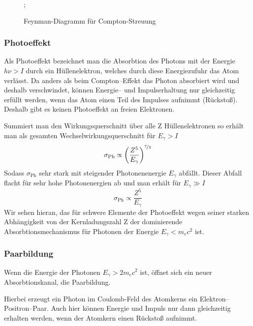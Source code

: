 \documentclass[Ex4_Zusammenfassung.tex]{subfiles}
\begin{document}
\begin{figure}[H]
	\centering
		;
		\caption{Feynman-Diagramm für Compton-Streuung}
	\end{figure}
	
\subsubsection{Photoeffekt}
Als Photoeffekt bezeichnet man die Absorbtion des Photons mit der Energie $ h \nu > I $ durch ein Hüllenelektron, welches durch diese Energiezufuhr das Atom verlässt. Da anders als beim Compton--Effekt das Photon absorbiert wird und deshalb verschwindet, können Energie-- und Impulserhaltung nur gleichzeitig erfüllt werden, wenn das Atom einen Teil des Impulses aufnimmt (Rückstoß). Deshalb gibt es keinen Photoeffekt an freien Elektronen.

Summiert man den Wirkungsquerschnitt über alle Z Hüllenelektronen so erhält man als gesamten Wechselwirkungsquerschnitt für $ E_{\gamma} > I$
\begin{equation}
	\sigma_{\text{Ph}} \propto \left(\frac{Z^5}{E_{\gamma}} \right)^{\nicefrac{7}{2}}
\end{equation} 
Sodass $ \sigma_{\text{Ph}} $ sehr stark mit steigender Photonenenergie $E_{\gamma}$ abfällt. Dieser Abfall flacht für sehr hohe Photonenergien ab und man erhält für $ E_{\gamma} \gg I $
\begin{equation}
	\sigma_{\text{Ph}} \propto \frac{Z^5}{E_{\gamma}}
\end{equation}
Wir sehen hieran, das für schwere Elemente der Photoeffekt wegen seiner starken Abhängigkeit von der Kernladungszahl Z der dominierende Absorbtionsmechanismus für Photonen der Energie $E_{\gamma} < m_e c^2$ ist.

\subsubsection{Paarbildung}
Wenn die Energie der Photonen $E_{\gamma} > 2 m_e c^2$ ist, öffnet sich ein neuer Absorbtionskanal, die Paarbildung.

Hierbei erzeugt ein Photon im Coulomb-Feld des Atomkerns ein Elektron--Positron--Paar. Auch hier können Energie und Impuls nur dann gleichzeitig erhalten werden, wenn der Atomkern einen Rückstoß aufnimmt.
\end{document}
